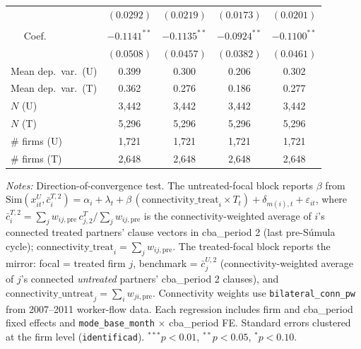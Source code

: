 \begin{table}[H]
\begin{tabular}{lcccc}
 & $(0.0292)$ & $(0.0219)$ & $(0.0173)$ & $(0.0201)$ \\
\addlinespace[2pt]
\multicolumn{5}{l}{$\text{connectivity\_untreat}_j \times \text{placebo}_t$ \quad (treated focal)} \\
$\quad$ Coef.\ & $-0.1141^{**}$ & $-0.1135^{**}$ & $-0.0924^{**}$ & $-0.1100^{**}$ \\
 & $(0.0508)$ & $(0.0457)$ & $(0.0382)$ & $(0.0461)$ \\
\addlinespace[2pt]
Mean dep.\ var.\ (U) & 0.399 & 0.300 & 0.206 & 0.302 \\
Mean dep.\ var.\ (T) & 0.362 & 0.276 & 0.186 & 0.277 \\
$N$ (U) & 3,442 & 3,442 & 3,442 & 3,442 \\
$N$ (T) & 5,296 & 5,296 & 5,296 & 5,296 \\
\# firms (U) & 1,721 & 1,721 & 1,721 & 1,721 \\
\# firms (T) & 2,648 & 2,648 & 2,648 & 2,648 \\
\bottomrule
\end{tabular}
\begin{minipage}{\linewidth}
\footnotesize\vspace{4pt}
\textit{Notes:} Direction-of-convergence test. The untreated-focal block reports $\beta$ from $\text{Sim}(x^U_{it}, \bar c^{T,2}_i) = \alpha_i + \lambda_t + \beta\,(\text{connectivity\_treat}_i \times T_t) + \delta_{m(i),t} + \varepsilon_{it}$, where $\bar c^{T,2}_i = \sum_j w_{ij,\text{pre}} \, c^T_{j,2} / \sum_j w_{ij,\text{pre}}$ is the connectivity-weighted average of $i$'s connected treated partners' clause vectors in cba\_period 2 (last pre-Súmula cycle); $\text{connectivity\_treat}_i = \sum_j w_{ij,\text{pre}}$. The treated-focal block reports the mirror: focal = treated firm $j$, benchmark = $\bar c^{U,2}_j$ (connectivity-weighted average of $j$'s connected \textit{untreated} partners' cba\_period 2 clauses), and $\text{connectivity\_untreat}_j = \sum_i w_{ji,\text{pre}}$. Connectivity weights use \texttt{bilateral\_conn\_pw} from 2007--2011 worker-flow data. Each regression includes firm and cba\_period fixed effects and \texttt{mode\_base\_month} $\times$ cba\_period FE. Standard errors clustered at the firm level (\texttt{identificad}). $^{***}p<0.01$, $^{**}p<0.05$, $^{*}p<0.10$.
\end{minipage}
\end{table}

